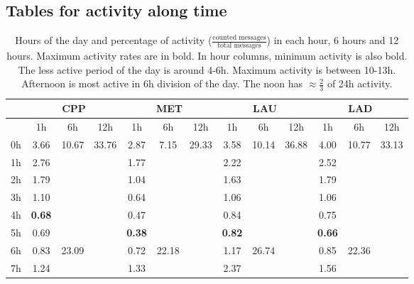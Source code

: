 \documentclass[%
 aip,
 jmp,%
 amsmath,amssymb,
 reprint,%
]{revtex4-1}
\begin{document}
\clearpage

\subsection{Tables for activity along time}\label{tabTime}
\begin{table}
    \caption{Hours of the day and percentage of activity ($\frac{\text{counted messages}}{\text{total messages}}$) in each hour, 6 hours and 12 hours. Maximum activity rates are in bold. In hour columns, minimum activity is also bold. The less active period of the day is around 4-6h. Maximum activity is between 10-13h. Afternoon is most active in 6h division of the day. The noon has $\approx \frac{2}{3}$ of 24h activity. }
\begin{center}
    \begin{tabular}{ |l|| c|c|c| c|c|c| c|c|c| c|c|c|}
        \hline
    & \multicolumn{3}{c|}{CPP} & \multicolumn{3}{c|}{MET} & \multicolumn{3}{c|}{LAU} & \multicolumn{3}{c|}{LAD}  \\ \hline
    & 1h   & 6h & 12h &   1h & 6h & 12h &   1h & 6h & 12h &   1h & 6h & 12h \\ \hline\hline
0h  & 3.66 & \multirow{6}{*}{10.67} & \multirow{12}{*}{33.76} & 2.87  & \multirow{6}{*}{7.15} & \multirow{12}{*}{29.33} & 3.58 & \multirow{6}{*}{10.14} &  \multirow{12}{*}{36.88} & 4.00 & \multirow{6}{*}{10.77} & \multirow{12}{*}{33.13} \\
1h  & 2.76 &                        &                         & 1.77  & & &  2.22 & & & 2.52 & & \\
2h  & 1.79 &                        &                         & 1.04  & & & 1.63 & & & 1.79 & & \\
3h  & 1.10 &                        &                         & 0.64  & & & 1.06 & & & 1.06 & & \\
4h  & {\bf 0.68} &                        &                         & 0.47  & & &  0.84 & & & 0.75 & & \\
5h  & 0.69 &                        &                         & {\bf 0.38}  & & & {\bf 0.82} & & & {\bf 0.66} & & \\\cline{3-3}\cline{6-6}\cline{9-9}\cline{12-12}
6h  & 0.83 & \multirow{6}{*}{23.09} &                         & 0.72  & \multirow{6}{*}{22.18} & & 1.17 & \multirow{6}{*}{26.74} & & 0.85 & \multirow{6}{*}{22.36} &  \\
7h  & 1.24 &                        &                         & 1.33  & & & 2.37 & & & 1.56 & & \\

\end{tabular}
\end{center}
\end{table}
\end{document}
